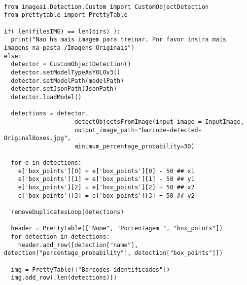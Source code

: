 \newpage
\begin{lstlisting}[caption=Aumento da \textit{bouding box} e recorte dos \textit{barcodes} em imagens individuais]

from imageai.Detection.Custom import CustomObjectDetection
from prettytable import PrettyTable

if( len(filesIMG) == len(dirs) ):
  print("Nao ha mais imagem para treinar. Por favor insira mais imagens na pasta /Imagens_Originais")
else:
  detector = CustomObjectDetection()
  detector.setModelTypeAsYOLOv3()
  detector.setModelPath(modelPath)
  detector.setJsonPath(JsonPath)
  detector.loadModel()

  detections = detector.
                    detectObjectsFromImage(input_image = InputImage, 
                    output_image_path="barcode-detected-OriginalBoxes.jpg",
                    minimum_percentage_probability=30)
                    
  for e in detections:
    e['box_points'][0] = e['box_points'][0] - 50 ## x1
    e['box_points'][1] = e['box_points'][1] - 50 ## y1
    e['box_points'][2] = e['box_points'][2] + 50 ## x2
    e['box_points'][3] = e['box_points'][3] + 50 ## y2

  removeDuplicatesLoop(detections)

  header = PrettyTable(["Nome", "Porcentagem ", "box_points"])
  for detection in detections:
    header.add_row([detection["name"], detection["percentage_probability"], detection["box_points"]])

  img = PrettyTable(["Barcodes identificados"])
  img.add_row([len(detections)])
\end{lstlisting}

\newpage

